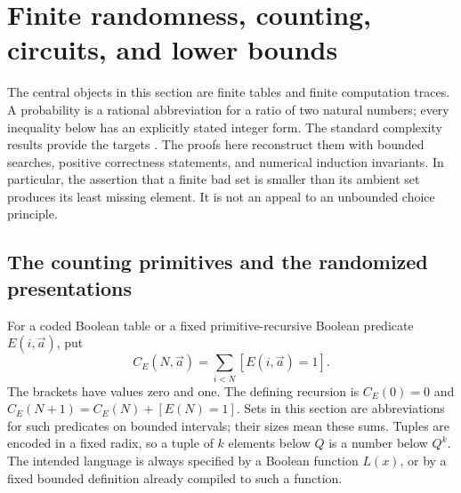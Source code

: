 \section{Finite randomness, counting, circuits, and lower bounds}
\label{sec:random-lower}

The central objects in this section are finite tables and finite computation
traces. A probability is a rational abbreviation for a ratio of two natural
numbers; every inequality below has an explicitly stated integer form.
The standard complexity results provide the targets
\cite{adleman1978,lautemann1983,shannon1949,katz2011}.
The proofs here reconstruct them with bounded searches, positive correctness
statements, and numerical induction invariants. In particular, the assertion
that a finite bad set is smaller than its ambient set produces its least
missing element. It is not an appeal to an unbounded choice principle.

\subsection{The counting primitives and the randomized presentations}

For a coded Boolean table or a fixed primitive-recursive Boolean predicate
$E(i,\vec a)$, put
\[
 C_E(N,\vec a)=\sum_{i<N}[E(i,\vec a)=1].
\]
The brackets have values zero and one. The defining recursion is
$C_E(0)=0$ and $C_E(N+1)=C_E(N)+[E(N)=1]$.
Sets in this section are abbreviations for such predicates on bounded
intervals; their sizes mean these sums. Tuples are encoded in a fixed radix,
so a tuple of $k$ elements below $Q$ is a number below $Q^k$.
The intended language is always specified by a Boolean function $L(x)$,
or by a fixed bounded definition already compiled to such a function.

